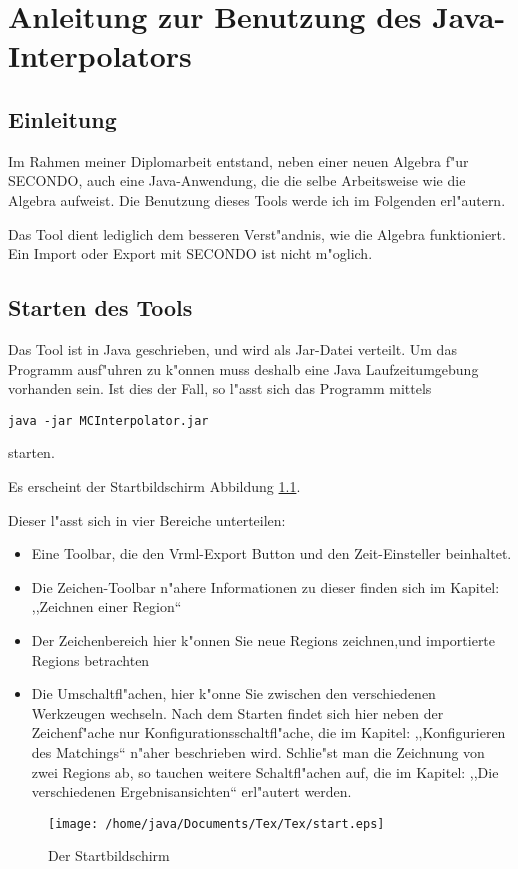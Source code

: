 
\chapter{Anleitung zur Benutzung des Java-Interpolators}
\minitoc
\newpage
\section{Einleitung}
Im Rahmen meiner Diplomarbeit entstand, neben einer neuen Algebra f"ur SECONDO, auch eine Java-Anwendung, die die selbe Arbeitsweise wie die Algebra aufweist. Die Benutzung dieses Tools werde ich im Folgenden erl"autern.

Das Tool dient lediglich dem besseren Verst"andnis, wie die Algebra funktioniert. Ein Import oder Export mit SECONDO ist nicht m"oglich.
\section{Starten des Tools}
Das Tool ist in Java geschrieben, und wird als Jar-Datei verteilt. Um das Programm ausf"uhren zu k"onnen muss deshalb eine Java Laufzeitumgebung vorhanden sein. Ist dies der Fall, so l"asst sich das Programm mittels \begin{verbatim}
java -jar MCInterpolator.jar
\end{verbatim}  starten.

Es erscheint der Startbildschirm Abbildung \ref{fig:start}.

Dieser l"asst sich in vier Bereiche unterteilen:
\begin{itemize}
\item Eine Toolbar, die den Vrml-Export Button und den Zeit-Einsteller beinhaltet. 
\item Die Zeichen-Toolbar n"ahere Informationen zu dieser finden sich im Kapitel: ,,Zeichnen einer Region``
\item Der Zeichenbereich hier k"onnen Sie neue Regions zeichnen,und importierte Regions betrachten
\item Die Umschaltfl"achen, hier k"onne Sie zwischen den verschiedenen Werkzeugen wechseln. Nach dem Starten findet sich hier neben der Zeichenf"ache nur Konfigurationsschaltfl"ache, die im Kapitel: ,,Konfigurieren des Matchings`` n"aher beschrieben wird. Schlie"st man die Zeichnung von zwei Regions ab, so tauchen weitere Schaltfl"achen auf, die im Kapitel: ,,Die verschiedenen Ergebnisansichten`` erl"autert werden.
\end{itemize} 

\begin{figure}
   \centering
   \texttt{[image: /home/java/Documents/Tex/Tex/start.eps]}
   \caption{Der Startbildschirm}
   \label{fig:start}
\end{figure}

